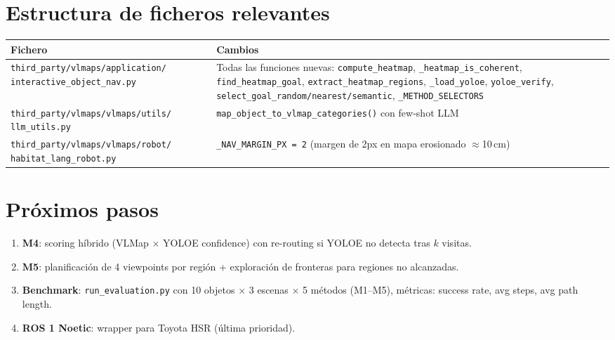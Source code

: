 \documentclass[11pt,a4paper]{article}
\begin{document}
\section{Estructura de ficheros relevantes}

\begin{center}
\begin{longtable}{p{7.5cm}p{7cm}}
\toprule
\textbf{Fichero} & \textbf{Cambios} \\
\midrule
\texttt{third\_party/vlmaps/application/} \texttt{interactive\_object\_nav.py}
& Todas las funciones nuevas: \texttt{compute\_heatmap}, \texttt{\_heatmap\_is\_coherent}, \texttt{find\_heatmap\_goal}, \texttt{extract\_heatmap\_regions}, \texttt{\_load\_yoloe}, \texttt{yoloe\_verify}, \texttt{select\_goal\_random/nearest/semantic}, \texttt{\_METHOD\_SELECTORS} \\
\midrule
\texttt{third\_party/vlmaps/vlmaps/utils/} \texttt{llm\_utils.py}
& \texttt{map\_object\_to\_vlmap\_categories()} con few-shot LLM \\
\midrule
\texttt{third\_party/vlmaps/vlmaps/robot/} \texttt{habitat\_lang\_robot.py}
& \texttt{\_NAV\_MARGIN\_PX = 2} (margen de 2px en mapa erosionado $\approx$10\,cm) \\
\bottomrule
\end{longtable}
\end{center}

\section{Próximos pasos}

\begin{enumerate}
  \item \textbf{M4}: scoring híbrido (VLMap $\times$ YOLOE confidence) con
        re-routing si YOLOE no detecta tras $k$ visitas.
  \item \textbf{M5}: planificación de 4 viewpoints por región + exploración de
        fronteras para regiones no alcanzadas.
  \item \textbf{Benchmark}: \texttt{run\_evaluation.py} con 10 objetos $\times$
        3 escenas $\times$ 5 métodos (M1--M5), métricas: success rate,
        avg steps, avg path length.
  \item \textbf{ROS 1 Noetic}: wrapper para Toyota HSR (última prioridad).
\end{enumerate}
\end{document}

